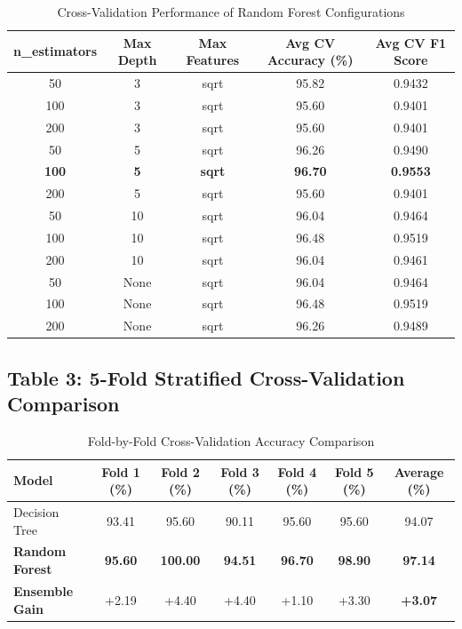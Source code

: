 \documentclass[12pt,a4paper]{article}
\begin{document}
\begin{table}[H]
\centering
\begin{tabular}{ccccc}
\toprule
\textbf{n\_estimators} & \textbf{Max Depth} & \textbf{Max Features} & \textbf{Avg CV Accuracy (\%)} & \textbf{Avg CV F1 Score} \\
\midrule
50 & 3 & sqrt & 95.82 & 0.9432 \\
100 & 3 & sqrt & 95.60 & 0.9401 \\
200 & 3 & sqrt & 95.60 & 0.9401 \\
50 & 5 & sqrt & 96.26 & 0.9490 \\
\textbf{100} & \textbf{5} & \textbf{sqrt} & \textbf{96.70} & \textbf{0.9553} \\
200 & 5 & sqrt & 95.60 & 0.9401 \\
50 & 10 & sqrt & 96.04 & 0.9464 \\
100 & 10 & sqrt & 96.48 & 0.9519 \\
200 & 10 & sqrt & 96.04 & 0.9461 \\
50 & None & sqrt & 96.04 & 0.9464 \\
100 & None & sqrt & 96.48 & 0.9519 \\
200 & None & sqrt & 96.26 & 0.9489 \\
\bottomrule
\end{tabular}
\caption{Cross-Validation Performance of Random Forest Configurations}
\label{tab:exp5_rf_tuning}
\end{table}

\subsection*{Table 3: 5-Fold Stratified Cross-Validation Comparison}

\begin{table}[H]
\centering
\begin{tabular}{lcccccc}
\toprule
\textbf{Model} & \textbf{Fold 1 (\%)} & \textbf{Fold 2 (\%)} & \textbf{Fold 3 (\%)} & \textbf{Fold 4 (\%)} & \textbf{Fold 5 (\%)} & \textbf{Average (\%)} \\
\midrule
Decision Tree & 93.41 & 95.60 & 90.11 & 95.60 & 95.60 & 94.07 \\
\textbf{Random Forest} & \textbf{95.60} & \textbf{100.00} & \textbf{94.51} & \textbf{96.70} & \textbf{98.90} & \textbf{97.14} \\
\midrule
\textbf{Ensemble Gain} & +2.19 & +4.40 & +4.40 & +1.10 & +3.30 & \textbf{+3.07} \\
\bottomrule
\end{tabular}
\caption{Fold-by-Fold Cross-Validation Accuracy Comparison}
\label{tab:exp5_cv_comparison}
\end{table}
\end{document}
